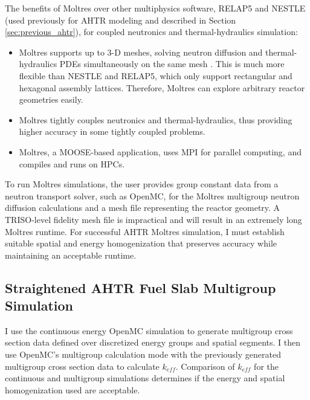 The benefits of Moltres over other multiphysics software, RELAP5 and NESTLE 
(used previously for \gls{AHTR} modeling and described in Section 
\ref{sec:previous_ahtr}), for coupled neutronics and thermal-hydraulics simulation: 
\begin{itemize}
  \item Moltres supports up to 3-D meshes, solving neutron diffusion and 
  thermal-hydraulics \glspl{PDE} simultaneously on the same mesh 
  \cite{park_advancement_2020}. This is much more flexible than 
  \gls{NESTLE} and RELAP5, which only support rectangular and hexagonal assembly 
  lattices. Therefore, Moltres can explore arbitrary reactor geometries easily.
  \item Moltres tightly couples neutronics and thermal-hydraulics, thus providing
    higher accuracy in some tightly coupled problems. 
  \item Moltres, a \gls{MOOSE}-based application, uses MPI for parallel computing,
  and compiles and runs on \glspl{HPC}. 
\end{itemize}

To run Moltres simulations, the user provides group constant data from a neutron 
transport solver, such as OpenMC, for the Moltres multigroup neutron diffusion 
calculations and a mesh file representing the reactor geometry. 
A TRISO-level fidelity mesh file is impractical and will result in an extremely 
long Moltres runtime. 
For successful \gls{AHTR} Moltres simulation, I must establish 
suitable spatial and energy homogenization that preserves accuracy while 
maintaining an acceptable runtime.

\subsection{Straightened AHTR Fuel Slab Multigroup Simulation}
I use the continuous energy OpenMC simulation to generate 
multigroup cross section data defined over discretized energy groups 
and spatial segments. 
I then use OpenMC's multigroup calculation mode with the previously generated 
multigroup cross section data to calculate $k_{eff}$. 
Comparison of $k_{eff}$ for the continuous and multigroup simulations
determines if the energy and spatial homogenization used are acceptable. 

